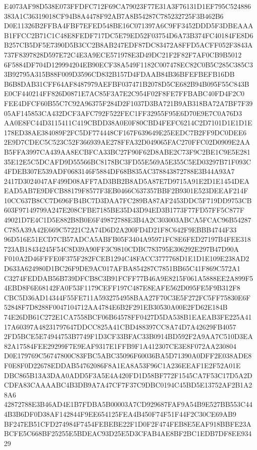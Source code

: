 \documentclass[UTF8,fontset=fandol,zihao=-4,a4paper]{ctexart}
\begin{document}
{{E4073AF98D538E073FFDFC712F69CA79023F77E31A3F76131D1EF795C524886383A1C36319018CF94B8A4478F92AB7A8B54287C785232725F3B462B6
D0E11326B2FFBA4FBF7EFED548BE16C071397A6C9FF3452DDD5F3DBEAAAB1FFCC2B71C1C48E8FEDF717DC5E79ED52F03754D6A73B374FC40184FE8D6
B257CB5DF5E7390D5B3CC2B8AB247EDF87DC83472A8FFD5ACFF052F3843A737F8397828D597E72C4E3A9ECE571978E3D49DC21F2F82F7AF0CB9B5012
6F5884DF704D129994204EB90ECF38A549F1182C007478EC82C0B5C285C385C33B92795A315B88F009D3596CD832B157D4FDAAB84B36BFEFBEFB16DB
B6B8DAB31CFF64AF8487979AEFBF037471B2078D5CE682B94B095F55C843BE0CF440214FF826D0871E7AC85F3A7E2C954F02F8FE7FFBABC40FD4F2C0
FEE4DFCF60B55C7C92A96375F284D2F1037D3BA721B9AB318BA72A7BF7F3905AF145853CA432DCF3AFC792F522FEC1FF32955F95E6D70E9E7C0A76D3
AA0E8FC44D3115411C419CBDD38A0E0F80CBD4FEFC6214C2D7101D1E1D1E178ED38AE384089F2FC5DF774448CF167F639649E25EEDC7B2FF9DC0DEE6
2E9D7CDEC5C523C52F366939AE278FFA32D049065FAC270FFC02D0909E2AAB5FFA3997CA439AA8ECBFCA33BC27F90F62D8ABE2C73F9C2BE1C9E5E281
35E12E5C5DCAFD9D55566BC8178BC3FD55E569A5E355C5ED03297B71F093C4FDEB307E539ADF0683146F5884DF68B835AC378843872788E3B44A93A7
2417D3024047AF499D08AFF7AD3BB2B8AD5A87E7D9715A91E2D1E1454DEAEAD5AB7E9DFCB88179F8577F3EB0466C637357BBF2B9301E523DEEAF214F
10CC637B8CC7D696FB4BC7D3DAA7FC289BA87AF2453DDC5F719DD9753CB603F97149799A247E208CFBE7185BE35D43D94ED3B1773F77FD57FF5C877F
49021D7E4C1D5E882B8B0E6F49872788E3B4A2C303003ABCA5FCAC96B54287C785A39A42E669C57221C2A74D6D2A200FD4D21F8C642F9EBBB4744F33
96D516E51ECD7CB57ADCA5ABFB05F3404A95971FC8E6FED27197B4FEE318723AB18434245F54C8D39A90FF3C9810CDBC783795E306292E297B47D90A
F010A2D46FFFE0F375F282FCEB1294C48FACC3777768D1E1D1E109E238AD2D633A624980D1BC26F9DE9AC017AFBA854287C7851BB65C41F869C572A1
C3274FEDDAB56B739DFCB8C3B91FCFF77B46A9E8215F061A5888EE2A899F54EBD8F6E68142FA0F53F1179CEFF197C487E8EAFE562D095FE5F9B312F8
CBC5D36AD14344F55FE711A5932754958BAA27F70C3E5F272FC5FF75830E6F52848F7D8288F0047104712AA4784E6B2F291EB30530A00E2FD62E184B
74E26DB61C272E1CA7558BCF06B64578FF0427D5DA538B1EAEAB3FE225A4117A60397A48231797647DDCC825A41CBD488397CC8A74D7A42629FB4057
2FD5BCE5E74944753B7749F1D3CF33BFAC33B0914BD592F2A9AA7C510D3EA82A17584FEE29299F7E9EAF9317E1FFB9F1A412307CE3E8F072AA230804
D0E179769C56747800C83FBC5ABC35096F60036BA5D71390A0DFF2E038ADE8F0E8F0D22678EDDAB54762086F8A1EA8A53F96C1A236EEAF1E2F52A01E
DBC865B13A3DAA0ADD5F3A5E4A420FD1D58BF772F1545CA7F53C17D5A2DCDFA83CAAAABC4B3DB9A7A47CF7F37C9DBC0194C45BD5E13752AF2B1A28A6
42872788E3B46AD4E1B7FDBA5B00003A7CD929687FAF9A54B9E527BB553C444B3B6DF0D38AF142844F9EE654125FEA4B450F74F51F44F2C30CE69AB9
BF247EB51CFD274984F7454FEBEBE22F1D0F2F474FEB8E5EAF918BBFE23ABCFE5C668BF25255E5BDEAC93D25E5D3CFAB4AE8BF2BC1EDB7DF8EE93429
}}
\end{document}
